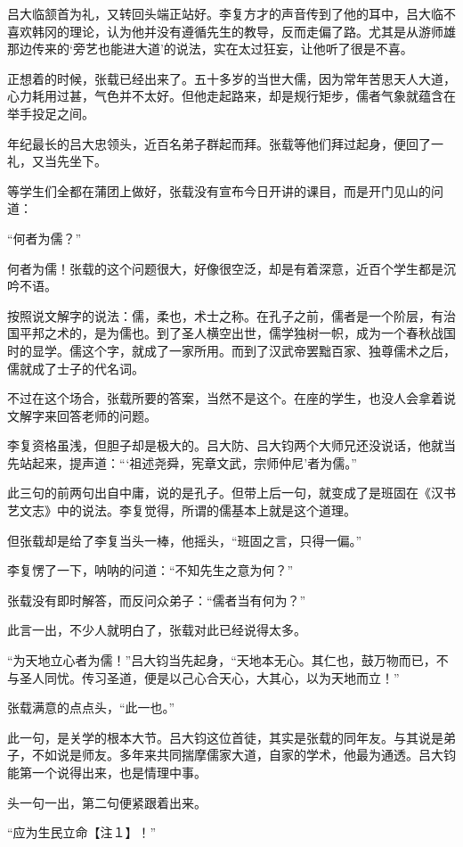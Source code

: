 吕大临颔首为礼，又转回头端正站好。李复方才的声音传到了他的耳中，吕大临不喜欢韩冈的理论，认为他并没有遵循先生的教导，反而走偏了路。尤其是从游师雄那边传来的‘旁艺也能进大道’的说法，实在太过狂妄，让他听了很是不喜。

正想着的时候，张载已经出来了。五十多岁的当世大儒，因为常年苦思天人大道，心力耗用过甚，气色并不太好。但他走起路来，却是规行矩步，儒者气象就蕴含在举手投足之间。

年纪最长的吕大忠领头，近百名弟子群起而拜。张载等他们拜过起身，便回了一礼，又当先坐下。

等学生们全都在蒲团上做好，张载没有宣布今日开讲的课目，而是开门见山的问道：

“何者为儒？”

何者为儒！张载的这个问题很大，好像很空泛，却是有着深意，近百个学生都是沉吟不语。

按照说文解字的说法：儒，柔也，术士之称。在孔子之前，儒者是一个阶层，有治国平邦之术的，是为儒也。到了圣人横空出世，儒学独树一帜，成为一个春秋战国时的显学。儒这个字，就成了一家所用。而到了汉武帝罢黜百家、独尊儒术之后，儒就成了士子的代名词。

不过在这个场合，张载所要的答案，当然不是这个。在座的学生，也没人会拿着说文解字来回答老师的问题。

李复资格虽浅，但胆子却是极大的。吕大防、吕大钧两个大师兄还没说话，他就当先站起来，提声道：“‘祖述尧舜，宪章文武，宗师仲尼’者为儒。”

此三句的前两句出自中庸，说的是孔子。但带上后一句，就变成了是班固在《汉书艺文志》中的说法。李复觉得，所谓的儒基本上就是这个道理。

但张载却是给了李复当头一棒，他摇头，“班固之言，只得一偏。”

李复愣了一下，呐呐的问道：“不知先生之意为何？”

张载没有即时解答，而反问众弟子：“儒者当有何为？”

此言一出，不少人就明白了，张载对此已经说得太多。

“为天地立心者为儒！”吕大钧当先起身，“天地本无心。其仁也，鼓万物而已，不与圣人同忧。传习圣道，便是以己心合天心，大其心，以为天地而立！”

张载满意的点点头，“此一也。”

此一句，是关学的根本大节。吕大钧这位首徒，其实是张载的同年友。与其说是弟子，不如说是师友。多年来共同揣摩儒家大道，自家的学术，他最为通透。吕大钧能第一个说得出来，也是情理中事。

头一句一出，第二句便紧跟着出来。

“应为生民立命【注１】！”

